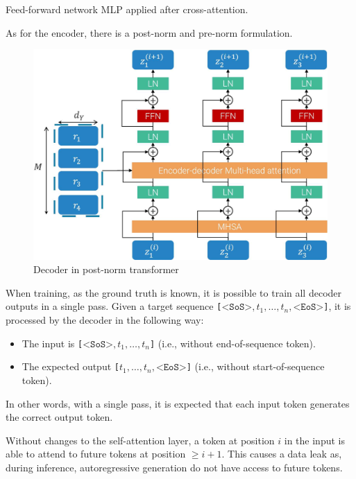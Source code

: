 \begin{description}
\begin{descriptionlist}
            \item[Feed-forward network]
                MLP applied after cross-attention.
        \end{descriptionlist}

        \begin{remark}
            As for the encoder, there is a post-norm and pre-norm formulation.
        \end{remark}

        \begin{figure}[H]
            \centering
            \includegraphics[width=0.5\linewidth]{./img/_transformer_decoder.jpg}
            \caption{Decoder in post-norm transformer}
        \end{figure}


    \item[Parallel training]
        When training, as the ground truth is known, it is possible to train all decoder outputs in a single pass. Given a target sequence \texttt{[$\texttt{<SoS>}, t_1, \dots, t_n, \texttt{<EoS>}$]}, it is processed by the decoder in the following way:
        \begin{itemize}
            \item The input is \texttt{[$\texttt{<SoS>}, t_1, \dots, t_n$]} (i.e., without end-of-sequence token).
            \item The expected output \texttt{[$t_1, \dots, t_n, \texttt{<EoS>}$]} (i.e., without start-of-sequence token).
        \end{itemize}
        In other words, with a single pass, it is expected that each input token generates the correct output token.

        \begin{remark}
            Without changes to the self-attention layer, a token at position $i$ in the input is able to attend to future tokens at position $\geq i+1$. This causes a data leak as, during inference, autoregressive generation do not have access to future tokens.
        \end{remark}


\end{description}
